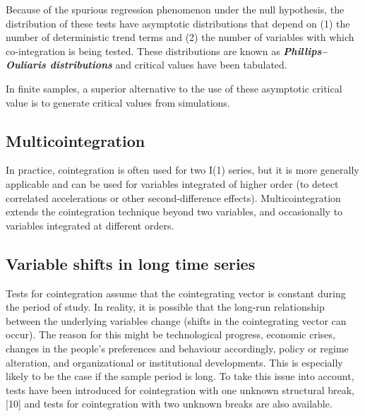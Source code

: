 Because of the spurious regression phenomenon under the null hypothesis, the distribution of these tests have asymptotic distributions that depend on (1) the number of deterministic trend terms and (2) the number of variables with which co-integration is being tested. These distributions are known as \textbf{\textit{Phillips–Ouliaris distributions}} and critical values have been tabulated. 

In finite samples, a superior alternative to the use of these asymptotic critical value is to generate critical values from simulations.

\subsection*{Multicointegration}
In practice, cointegration is often used for two I(1) series, but it is more generally applicable and can be used for variables integrated of higher order (to detect correlated accelerations or other second-difference effects). Multicointegration extends the cointegration technique beyond two variables, and occasionally to variables integrated at different orders.

\subsection*{Variable shifts in long time series}
Tests for cointegration assume that the cointegrating vector is constant during the period of study. In reality, it is possible that the long-run relationship between the underlying variables change (shifts in the cointegrating vector can occur). The reason for this might be technological progress, economic crises, changes in the people’s preferences and behaviour accordingly, policy or regime alteration, and organizational or institutional developments. This is especially likely to be the case if the sample period is long. To take this issue into account, tests have been introduced for cointegration with one unknown structural break,[10] and tests for cointegration with two unknown breaks are also available.


